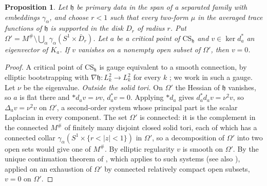 \documentclass[11pt]{amsart}
\newtheorem{proposition}[theorem]{Proposition}
\theoremstyle{definition}
\theoremstyle{remark}
\theoremstyle{plain}
\numberwithin{equation}{section}
\begin{document}
\begin{proposition}\label{prop:nontrapping}
Let $\mathfrak h$ be primary data in the span of a separated family with embeddings
$\gamma_\alpha$, and choose $r<1$ such that every two-form $\mu$ in the averaged trace functions
of $\mathfrak h$ is supported in the disk $D_r$ of radius $r$. Put
$\Omega'=M^\#\setminus\bigcup_\alpha\gamma_\alpha(S^1\times\bar D_r)$. Let $a$ be a critical point
of $\mathrm{CS}_{\mathfrak h}$ and $v\in\ker d_a^*$ an eigenvector of $K_a$. If $v$ vanishes on a
nonempty open subset of $\Omega'$, then $v=0$.
\end{proposition}

\begin{proof}
A critical point of $\mathrm{CS}_{\mathfrak h}$ is gauge equivalent to a smooth connection, by
elliptic bootstrapping with $\nabla\mathfrak h\colon L^2_k\to L^2_k$ for every $k$
\cite[Proposition~6.1]{DFL}; we work in such a gauge. Let $\nu$ be the eigenvalue.
\emph{Outside the solid tori.} On $\Omega'$ the Hessian of
$\mathfrak h$ vanishes, so $a$ is flat there and $*d_av=\nu v$, $d_a^*v=0$. Applying $*d_a$ gives
$d_a^*d_av=\nu^2v$, so $\Delta_av=\nu^2v$ on $\Omega'$, a second-order system whose principal part
is the scalar Laplacian in every component. The set $\Omega'$ is connected: it is the complement
in the connected $M^\#$ of finitely many disjoint closed solid tori, each of which has a connected
collar $\gamma_\alpha(S^1\times\{r<|z|<1\})$ in $\Omega'$, so a decomposition of $\Omega'$ into two
open sets would give one of $M^\#$. By elliptic regularity $v$ is smooth on $\Omega'$. By the
unique continuation theorem of \cite{Aronszajn}, which applies to such systems
\cite[Remark~3]{Aronszajn} (see also \cite[Remark~8(a)]{Booss-ucp}), applied on an exhaustion of
$\Omega'$ by connected relatively compact open subsets, $v=0$ on $\Omega'$.


\end{proof}
\end{document}
